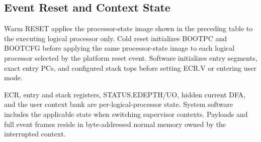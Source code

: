 \Needspace{4.0in}
\subsection{Event Reset and Context State}


\Needspace{1.8in}
Warm RESET applies the processor-state image shown in the preceding table to the executing logical processor only. Cold
reset initializes BOOTPC and BOOTCFG before applying the same processor-state image to each logical processor selected
by the platform reset event. Software initializes entry segments, exact entry PCs, and configured stack tops before setting ECR.V
or entering user mode.

ECR, entry and stack registers, STATUS.EDEPTH/UO, hidden current DFA, and the user context bank are
per-logical-processor state. System software includes the applicable state when switching supervisor contexts.
Payloads and full event frames reside in byte-addressed normal memory owned by the interrupted context.
